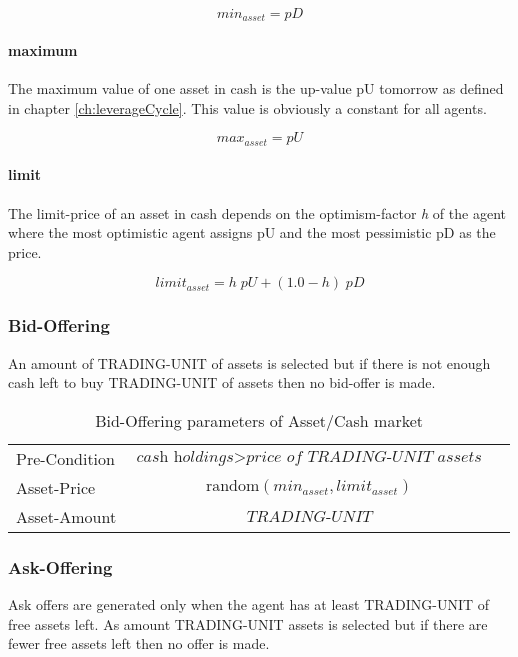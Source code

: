 \documentclass[Bachelorarbeit.tex]{subfiles}
\begin{document}
\begin{equation}
min_{asset} = \textit{pD}
\end{equation}

\paragraph{maximum}
The maximum value of one asset in cash is the up-value pU tomorrow as defined in chapter \ref{ch:leverageCycle}. This value is obviously a constant for all agents.

\begin{equation}
max_{asset} = \textit{pU}
\end{equation}

\paragraph{limit}
The limit-price of an asset in cash depends on the optimism-factor \textit{h} of the agent where the most optimistic agent assigns pU and the most pessimistic pD as the price.

\begin{equation}
limit_{asset} = h \; pU + ( 1.0 - h ) \; pD
\end{equation}

\subsubsection{Bid-Offering}
An amount of TRADING-UNIT of assets is selected but if there is not enough cash left to buy TRADING-UNIT of assets then no bid-offer is made.

\begin{table}[H]
	\centering
	\caption{Bid-Offering parameters of Asset/Cash market}
	\begin{tabular} { l c r }
		\hline
		Pre-Condition & $\textit{cash holdings} > \textit{price of TRADING-UNIT assets}$  \\
		Asset-Price & $\mathrm{random}(min_{asset}, limit_{asset})$ \\
		Asset-Amount & $\textit{TRADING-UNIT}$ \\
		\hline
	\end{tabular}
\end{table}

\subsubsection{Ask-Offering}
Ask offers are generated only when the agent has at least TRADING-UNIT of free assets left. As amount TRADING-UNIT assets is selected but if there are fewer free assets left then no offer is made.
\end{document}
